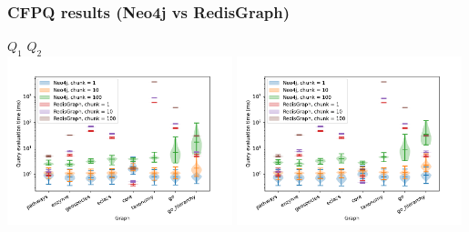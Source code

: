 \documentclass[xcolor=table,aspectratio=169]{beamer}
\begin{document}
\begin{frame}[fragile] \frametitle{CFPQ results (Neo4j vs RedisGraph)}
  \begin{center}
    $Q_1$ \hspace{7cm} $Q_2$     \\
    \includegraphics[width=0.49\textwidth]{pictures/g1_result.pdf}
    \includegraphics[width=0.49\textwidth]{pictures/g2_result.pdf}
  \end{center}
\end{frame}
\end{document}
